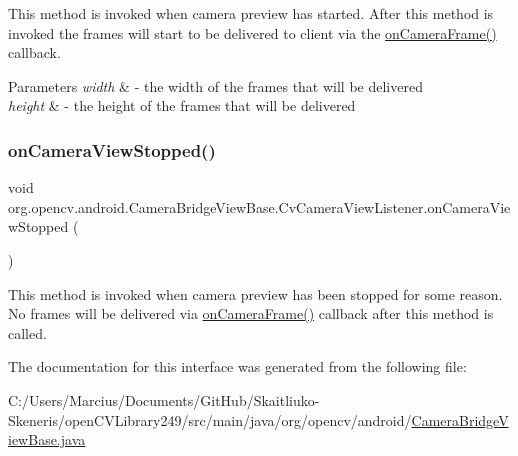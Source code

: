 This method is invoked when camera preview has started. After this method is invoked the frames will start to be delivered to client via the \mbox{\hyperlink{interfaceorg_1_1opencv_1_1android_1_1_camera_bridge_view_base_1_1_cv_camera_view_listener_a727a5b35122315b9278e5104c80749aa}{on\+Camera\+Frame()}} callback. 
\begin{DoxyParams}{Parameters}
{\em width} & -\/ the width of the frames that will be delivered \\
\hline
{\em height} & -\/ the height of the frames that will be delivered \\
\hline
\end{DoxyParams}
\mbox{\label{interfaceorg_1_1opencv_1_1android_1_1_camera_bridge_view_base_1_1_cv_camera_view_listener_a23d02d02b84ae6496da2ac1d8b7c3b45}} 
\subsubsection{\texorpdfstring{on\+Camera\+View\+Stopped()}{onCameraViewStopped()}}
{\footnotesize\ttfamily void org.\+opencv.\+android.\+Camera\+Bridge\+View\+Base.\+Cv\+Camera\+View\+Listener.\+on\+Camera\+View\+Stopped (\begin{DoxyParamCaption}{ }\end{DoxyParamCaption})}

This method is invoked when camera preview has been stopped for some reason. No frames will be delivered via \mbox{\hyperlink{interfaceorg_1_1opencv_1_1android_1_1_camera_bridge_view_base_1_1_cv_camera_view_listener_a727a5b35122315b9278e5104c80749aa}{on\+Camera\+Frame()}} callback after this method is called. 

The documentation for this interface was generated from the following file\+:\begin{DoxyCompactItemize}
\item 
C\+:/\+Users/\+Marcius/\+Documents/\+Git\+Hub/\+Skaitliuko-\/\+Skeneris/open\+C\+V\+Library249/src/main/java/org/opencv/android/\mbox{\hyperlink{_camera_bridge_view_base_8java}{Camera\+Bridge\+View\+Base.\+java}}\end{DoxyCompactItemize}
